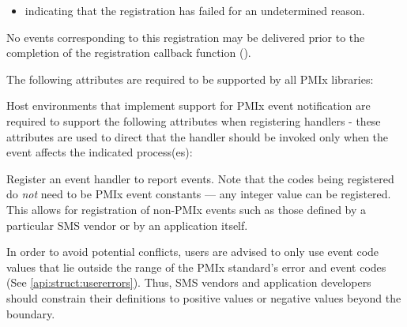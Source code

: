 \returnstart
\begin{itemize}
\item {} indicating that the registration
has failed for an undetermined reason.
\end{itemize}
\returnend

No events corresponding to this registration may be delivered prior to the completion of the registration callback function ().

\reqattrstart
The following attributes are required to be supported by all \ac{PMIx} libraries:


\divider

Host environments that implement support for \ac{PMIx} event notification are required to support the following attributes when registering handlers - these attributes are used to direct that the handler should be invoked only when the event affects the indicated process(es):


\reqattrend


\descr

Register an event handler to report events. Note that the codes being registered do \textit{not} need to be \ac{PMIx} event constants --- any integer value can be registered. This allows for registration of non-PMIx events such as those defined by a particular \ac{SMS} vendor or by an application itself.

\adviceuserstart
In order to avoid potential conflicts, users are advised to only use event code values that lie outside the range of the \ac{PMIx} standard's error and event codes (See \ref{api:struct:usererrors}). Thus, \ac{SMS} vendors and application developers should constrain their definitions to positive values or negative values beyond the  boundary.
\adviceuserend


